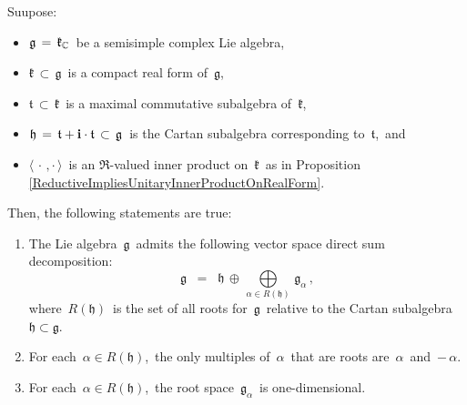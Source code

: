 \vskip 0.5cm
\begin{theorem}
\mbox{}
\vskip 0.05cm
\noindent
Suupose:
\begin{itemize}
\item
    \vskip -0.1cm
    $\mathfrak{g} \,=\, \mathfrak{k}_{\mathbb{C}}$\, be a semisimple complex Lie algebra,\,
\item
    $\mathfrak{k} \,\subset\, \mathfrak{g}$\, is a compact real form of \,$\mathfrak{g}$,\,
\item
    $\mathfrak{t} \,\subset\, \mathfrak{k}$\, is a maximal commutative subalgebra of \,$\mathfrak{k}$,\,
\item
    $\mathfrak{h} \,=\, \mathfrak{t} + \mathbf{i}\cdot\mathfrak{t} \,\subset\, \mathfrak{g}$\,
    is the Cartan subalgebra corresponding to \,$\mathfrak{t}$,\, and
\item
    $\langle\,\cdot\,,\cdot\,\rangle$\, is an $\Re$-valued inner product on
    \,$\mathfrak{k}$\, as in Proposition \ref{ReductiveImpliesUnitaryInnerProductOnRealForm}.
\end{itemize}
Then, the following statements are true:
\begin{enumerate}
\item
    The Lie algebra \,$\mathfrak{g}$\, admits the following vector space direct sum decomposition:
    \begin{equation*}
    \mathfrak{g}
    \;\; = \;\;
        \mathfrak{h} \, \oplus \, \underset{\alpha \in R(\mathfrak{h})}{\bigoplus}\,\mathfrak{g}_{\alpha}\,,
    \end{equation*}
    where \,$R(\mathfrak{h})$\, is the set of all roots for \,$\mathfrak{g}$\,
    relative to the Cartan subalgebra \,$\mathfrak{h} \subset \mathfrak{g}$.\,
\item
    For each \,$\alpha \in R(\mathfrak{h})$,\, the only multiples of \,$\alpha$\, that are roots
    are \,$\alpha$\, and \,$-\,\alpha$.\,
\item
    For each \,$\alpha \in R(\mathfrak{h})$,\, the root space \,$\mathfrak{g}_{\alpha}$\,
    is one-dimensional.
\end{enumerate}
\end{theorem}











